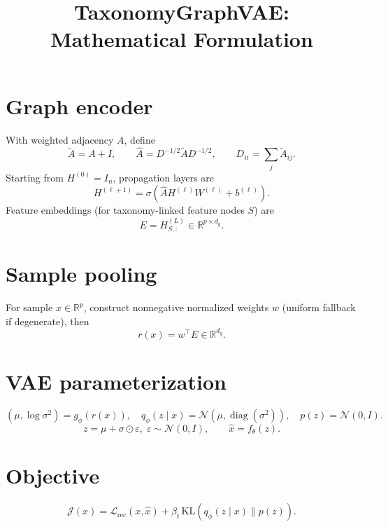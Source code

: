 \documentclass[11pt]{article}
\title{TaxonomyGraphVAE: Mathematical Formulation}
\date{}
\begin{document}
\maketitle

\section{Graph encoder}
With weighted adjacency $A$, define
\begin{equation}
\tilde A=A+I,\qquad \hat A=D^{-1/2}\tilde A D^{-1/2},\qquad D_{ii}=\sum_j\tilde A_{ij}.
\end{equation}
Starting from $H^{(0)}=I_n$, propagation layers are
\begin{equation}
H^{(\ell+1)}=\sigma\!\left(\hat A H^{(\ell)}W^{(\ell)}+b^{(\ell)}\right).
\end{equation}
Feature embeddings (for taxonomy-linked feature nodes $S$) are
\begin{equation}
E=H^{(L)}_{S,:}\in\mathbb R^{p\times d_g}.
\end{equation}

\section{Sample pooling}
For sample $x\in\mathbb R^p$, construct nonnegative normalized weights $w$ (uniform fallback if degenerate), then
\begin{equation}
r(x)=w^\top E\in\mathbb R^{d_g}.
\end{equation}

\section{VAE parameterization}
\begin{equation}
(\mu,\log\sigma^2)=g_\phi(r(x)),
\quad
q_\phi(z\mid x)=\mathcal N(\mu,\operatorname{diag}(\sigma^2)),
\quad
p(z)=\mathcal N(0,I).
\end{equation}
\begin{equation}
z=\mu+\sigma\odot\varepsilon,\; \varepsilon\sim\mathcal N(0,I),
\qquad
\hat x=f_\theta(z).
\end{equation}

\section{Objective}
\begin{equation}
\mathcal J(x)=\mathcal L_{\mathrm{rec}}(x,\hat x)+\beta_t\,\mathrm{KL}(q_\phi(z\mid x)\|p(z)).
\end{equation}
\end{document}
